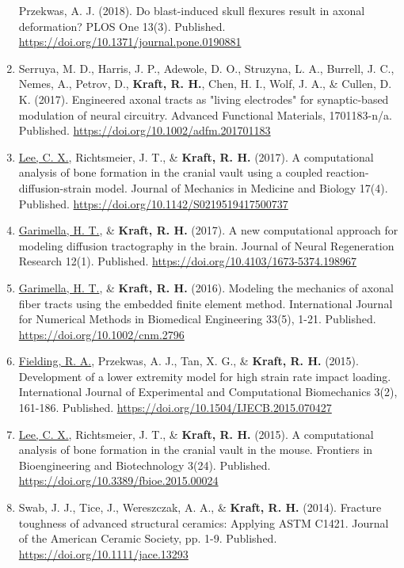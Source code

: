 \documentclass[a4paper,10pt]{article}
\begin{document}
\begin{enumerate}
 Przekwas, A. J. (2018). Do blast-induced skull flexures result in axonal deformation? PLOS One 13(3). Published. \url{https://doi.org/10.1371/journal.pone.0190881}
 \item	Serruya, M. D., Harris, J. P., Adewole, D. O., Struzyna, L. A., Burrell, J. C., Nemes, A., Petrov, D., \textbf{\textbf{Kraft,} R. H.}, Chen, H. I., Wolf, J. A., \&
 Cullen, D. K. (2017). Engineered axonal tracts as    "living electrodes" for synaptic-based modulation of neural circuitry. Advanced Functional Materials, 1701183-n/a. Published. \url{https://doi.org/10.1002/adfm.201701183}
 \item	\underline{Lee, C. X.}, Richtsmeier, J. T., \&
 \textbf{\textbf{Kraft,} R. H.} (2017). A computational analysis of bone formation in the cranial vault using a coupled reaction-diffusion-strain model. Journal of Mechanics in Medicine and Biology 17(4). Published. \url{https://doi.org/10.1142/S0219519417500737}
 \item	\underline{Garimella, H. T.}, \&
 \textbf{\textbf{Kraft,} R. H.} (2017). A new computational approach for modeling diffusion tractography in the brain. Journal of Neural Regeneration Research 12(1). Published. \url{https://doi.org/10.4103/1673-5374.198967}
 \item	\underline{Garimella, H. T.}, \&
 \textbf{\textbf{Kraft,} R. H.} (2016). Modeling the mechanics of axonal fiber tracts using the embedded finite element method. International Journal for Numerical Methods in Biomedical Engineering 33(5), 1-21. Published. \url{https://doi.org/10.1002/cnm.2796}
 \item	\underline{Fielding, R. A.}, Przekwas, A. J., Tan, X. G., \&
 \textbf{\textbf{Kraft,} R. H.} (2015). Development of a lower extremity model for high strain rate impact loading. International Journal of Experimental and Computational Biomechanics 3(2), 161-186. Published. \url{https://doi.org/10.1504/IJECB.2015.070427}
 \item	\underline{Lee, C. X.}, Richtsmeier, J. T., \&
 \textbf{\textbf{Kraft,} R. H.} (2015). A computational analysis of bone formation in the cranial vault in the mouse. Frontiers in Bioengineering and Biotechnology 3(24). Published. \url{https://doi.org/10.3389/fbioe.2015.00024}
 \item	Swab, J. J., Tice, J., Wereszczak, A. A., \&
 \textbf{\textbf{Kraft,} R. H.} (2014). Fracture toughness of advanced structural ceramics: Applying ASTM C1421. Journal of the American Ceramic Society, pp. 1-9. Published. \url{https://doi.org/10.1111/jace.13293}

\end{enumerate}
\end{document}

